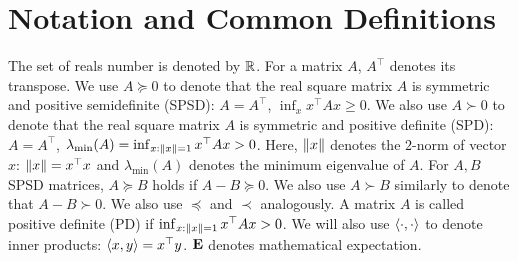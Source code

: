 \section{Notation and Common Definitions}
\label{sec:not}

The set of reals number is denoted by $\mathbb{R}$.
For a matrix $A$, $A^\top$ denotes its transpose.
We use $A\succeq 0$ to denote that the real  square matrix $A$ is symmetric and positive semidefinite (SPSD):
$A = A^\top$, $\inf_x x^\top A x\ge 0$.
We also use $A \succ 0$ to denote that the real square matrix $A$ is symmetric and positive definite (SPD):
$A = A^\top$, $\lambda_{\min}(A) =\inf_{x:\left\| x\right\|=1} x^\top A x>0$. 
Here, $\left\| x\right\|$ denotes the $2$-norm of vector $x$: $\left\| x\right\| = x^\top x$ and 
$\lambda_{\min}(A)$ denotes the minimum eigenvalue of $A$.
For $A,B$ SPSD matrices, $A\succeq B$ holds if $A-B\succeq 0$.
We also use $A\succ B$ similarly to denote that $A-B \succ 0$.
We also use $\preceq$ and $\prec$ analogously.
%
A matrix $A$ is called positive definite (PD) if $\inf_{x:\left\| x\right\|=1} x^\top A x >0$.
%
We will also use $\langle\cdot,\cdot\rangle$ to denote inner products: $\langle x,y\rangle = x^\top y$.
%
$\mathbf{E}$ denotes mathematical expectation.


